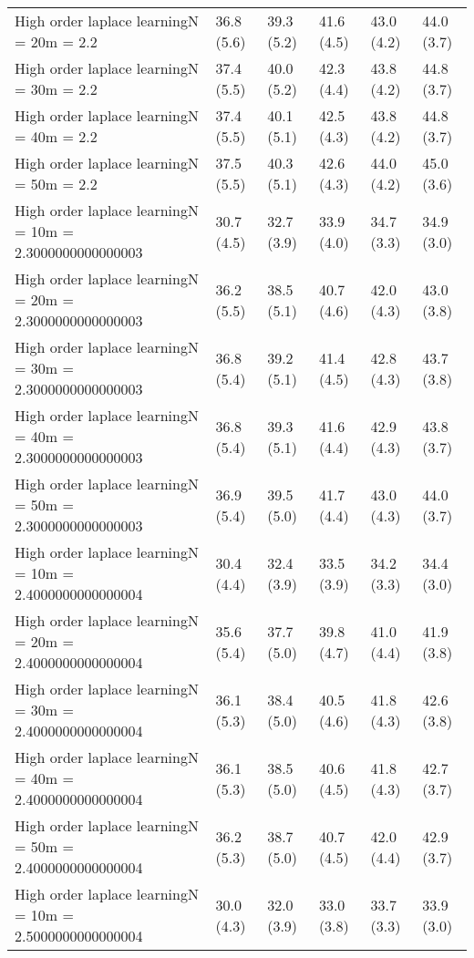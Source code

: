 \documentclass{article}
\begin{document}
\begin{table*}[t!]
\begin{center}
\begin{small}
\begin{sc}
\begin{tabular}{llllll}
High order laplace learningN = 20m = 2.2&36.8 (5.6)      &39.3 (5.2)      &41.6 (4.5)      &43.0 (4.2)      &44.0 (3.7)      \\
High order laplace learningN = 30m = 2.2&37.4 (5.5)      &40.0 (5.2)      &42.3 (4.4)      &43.8 (4.2)      &44.8 (3.7)      \\
High order laplace learningN = 40m = 2.2&37.4 (5.5)      &40.1 (5.1)      &42.5 (4.3)      &43.8 (4.2)      &44.8 (3.7)      \\
High order laplace learningN = 50m = 2.2&37.5 (5.5)      &40.3 (5.1)      &42.6 (4.3)      &44.0 (4.2)      &45.0 (3.6)      \\
High order laplace learningN = 10m = 2.3000000000000003&30.7 (4.5)      &32.7 (3.9)      &33.9 (4.0)      &34.7 (3.3)      &34.9 (3.0)      \\
High order laplace learningN = 20m = 2.3000000000000003&36.2 (5.5)      &38.5 (5.1)      &40.7 (4.6)      &42.0 (4.3)      &43.0 (3.8)      \\
High order laplace learningN = 30m = 2.3000000000000003&36.8 (5.4)      &39.2 (5.1)      &41.4 (4.5)      &42.8 (4.3)      &43.7 (3.8)      \\
High order laplace learningN = 40m = 2.3000000000000003&36.8 (5.4)      &39.3 (5.1)      &41.6 (4.4)      &42.9 (4.3)      &43.8 (3.7)      \\
High order laplace learningN = 50m = 2.3000000000000003&36.9 (5.4)      &39.5 (5.0)      &41.7 (4.4)      &43.0 (4.3)      &44.0 (3.7)      \\
High order laplace learningN = 10m = 2.4000000000000004&30.4 (4.4)      &32.4 (3.9)      &33.5 (3.9)      &34.2 (3.3)      &34.4 (3.0)      \\
High order laplace learningN = 20m = 2.4000000000000004&35.6 (5.4)      &37.7 (5.0)      &39.8 (4.7)      &41.0 (4.4)      &41.9 (3.8)      \\
High order laplace learningN = 30m = 2.4000000000000004&36.1 (5.3)      &38.4 (5.0)      &40.5 (4.6)      &41.8 (4.3)      &42.6 (3.8)      \\
High order laplace learningN = 40m = 2.4000000000000004&36.1 (5.3)      &38.5 (5.0)      &40.6 (4.5)      &41.8 (4.3)      &42.7 (3.7)      \\
High order laplace learningN = 50m = 2.4000000000000004&36.2 (5.3)      &38.7 (5.0)      &40.7 (4.5)      &42.0 (4.4)      &42.9 (3.7)      \\
High order laplace learningN = 10m = 2.5000000000000004&30.0 (4.3)      &32.0 (3.9)      &33.0 (3.8)      &33.7 (3.3)      &33.9 (3.0)      \\

\end{tabular}
\end{sc}
\end{small}
\end{center}
\end{table*}
\end{document}
